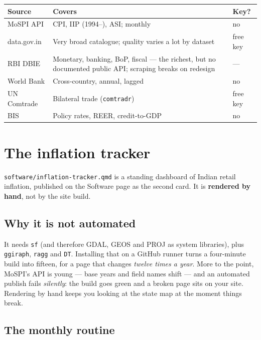 \documentclass[11pt,a4paper]{article}
\newcommand{\file}[1]{\texttt{#1}}
\begin{document}
\begin{center}
\begin{tabular}{@{}lp{7.4cm}l@{}}
\toprule
\textbf{Source} & \textbf{Covers} & \textbf{Key?} \\
\midrule
MoSPI API      & CPI, IIP (1994--), ASI; monthly & no \\
data.gov.in    & Very broad catalogue; quality varies a lot by dataset & free key \\
RBI DBIE       & Monetary, banking, BoP, fiscal --- the richest, but no documented public API; scraping breaks on redesign & --- \\
World Bank     & Cross-country, annual, lagged & no \\
UN Comtrade    & Bilateral trade (\texttt{comtradr}) & free key \\
BIS            & Policy rates, REER, credit-to-GDP & no \\
\bottomrule
\end{tabular}
\end{center}

\section{The inflation tracker}\label{sec:tracker}

\file{software/inflation-tracker.qmd} is a standing dashboard of Indian
retail inflation, published on the Software page as the second card. It is
\textbf{rendered by hand}, not by the site build.

\subsection{Why it is not automated}

It needs \texttt{sf} (and therefore GDAL, GEOS and PROJ as system
libraries), plus \texttt{ggiraph}, \texttt{ragg} and \texttt{DT}. Installing
that on a GitHub runner turns a four-minute build into fifteen, for a page
that changes \emph{twelve times a year}. More to the point, MoSPI's API is
young --- base years and field names shift --- and an automated publish
fails \emph{silently}: the build goes green and a broken page sits on your
site. Rendering by hand keeps you looking at the state map at the moment
things break.

\subsection{The monthly routine}
\end{document}
